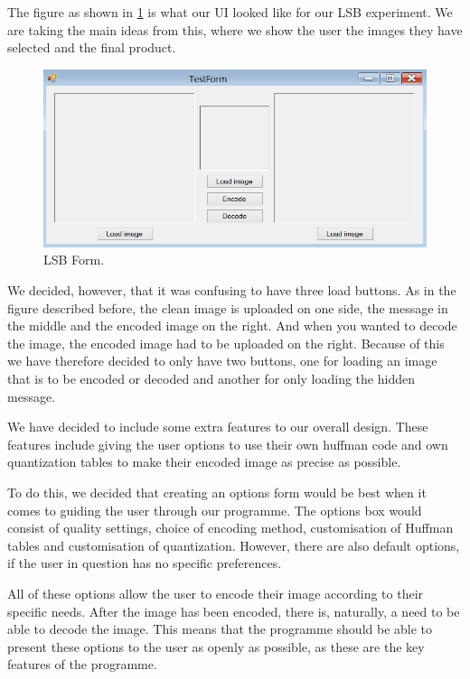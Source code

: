 The figure as shown in \ref{fig:LSBForm} is what our UI looked like for our LSB experiment.
We are taking the main ideas from this, where we show the user the images they have selected and the final product.
\begin{figure}
	\centering
	\includegraphics[width=1\textwidth]{figures/LSBForm.png}
	\caption{LSB Form.}
	\label{fig:LSBForm}
\end{figure}
We decided, however, that it was confusing to have three load buttons.
As in the figure described before, the clean image is uploaded on one side, the message in the middle and the encoded image on the right.
And when you wanted to decode the image, the encoded image had to be uploaded on the right.
Because of this we have therefore decided to only have two buttons, one for loading an image that is to be encoded or decoded and another for only loading the hidden message.

We have decided to include some extra features to our overall design.
These features include giving the user options to use their own huffman code and own quantization tables to make their encoded image as precise as possible.

To do this, we decided that creating an options form would be best when it comes to guiding the user through our programme.
The options box would consist of quality settings, choice of encoding method, customisation of Huffman tables and customisation of quantization.
However, there are also default options, if the user in question has no specific preferences.

All of these options allow the user to encode their image according to their specific needs.
After the image has been encoded, there is, naturally, a need to be able to decode the image.
This means that the programme should be able to present these options to the user as openly as possible, as these are the key features of the programme.

